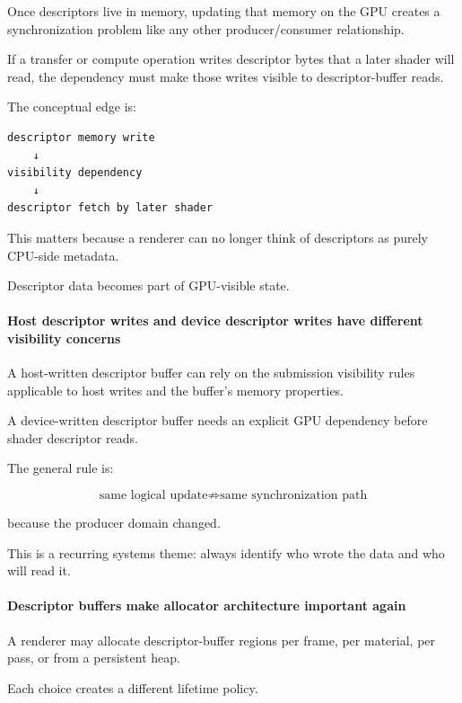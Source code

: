 Once descriptors live in memory, updating that memory on the GPU creates a synchronization problem like any other producer/consumer relationship.

If a transfer or compute operation writes descriptor bytes that a later shader will read, the dependency must make those writes visible to descriptor-buffer reads.

The conceptual edge is:

\begin{verbatim}
descriptor memory write
    ↓
visibility dependency
    ↓
descriptor fetch by later shader
\end{verbatim}

This matters because a renderer can no longer think of descriptors as purely CPU-side metadata.

Descriptor data becomes part of GPU-visible state.

\paragraph{Host descriptor writes and device descriptor writes have different visibility concerns}\label{host-descriptor-writes-and-device-descriptor-writes-have-different-visibility-concerns}

A host-written descriptor buffer can rely on the submission visibility rules applicable to host writes and the buffer's memory properties.

A device-written descriptor buffer needs an explicit GPU dependency before shader descriptor reads.

The general rule is:

\[
\boxed{
\text{same logical update}
\not\Rightarrow
\text{same synchronization path}
}
\]

because the producer domain changed.

This is a recurring systems theme: always identify who wrote the data and who will read it.

\paragraph{Descriptor buffers make allocator architecture important again}\label{descriptor-buffers-make-allocator-architecture-important-again}

A renderer may allocate descriptor-buffer regions per frame, per material, per pass, or from a persistent heap.

Each choice creates a different lifetime policy.

